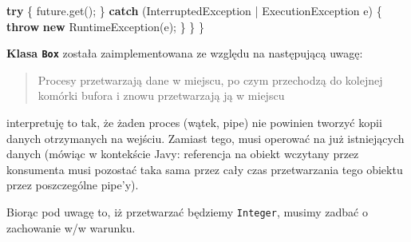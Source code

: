 \documentclass[11pt]{article}
\newenvironment{Shaded}{}{}
\newcommand{\KeywordTok}[1]{\textcolor[rgb]{0.00,0.44,0.13}{\textbf{{#1}}}}
\newcommand{\FunctionTok}[1]{\textcolor[rgb]{0.02,0.16,0.49}{{#1}}}
\newcommand{\NormalTok}[1]{{#1}}
\newcommand{\ControlFlowTok}[1]{\textcolor[rgb]{0.00,0.44,0.13}{\textbf{{#1}}}}
\newcommand{\OperatorTok}[1]{\textcolor[rgb]{0.40,0.40,0.40}{{#1}}}
\newcommand{\BuiltInTok}[1]{{#1}}
\begin{document}
\begin{Shaded}
\begin{Highlighting}[]
        \ControlFlowTok{try} \OperatorTok{\{}
\NormalTok{            future}\OperatorTok{.}\FunctionTok{get}\OperatorTok{();}
        \OperatorTok{\}} \ControlFlowTok{catch} \OperatorTok{(}\BuiltInTok{InterruptedException} \OperatorTok{|} \BuiltInTok{ExecutionException}\NormalTok{ e}\OperatorTok{)} \OperatorTok{\{}
            \ControlFlowTok{throw} \KeywordTok{new} \BuiltInTok{RuntimeException}\OperatorTok{(}\NormalTok{e}\OperatorTok{);}
        \OperatorTok{\}}
    \OperatorTok{\}}
\OperatorTok{\}}
\end{Highlighting}
\end{Shaded}

    \textbf{Klasa \texttt{Box}} została zaimplementowana ze względu na
następującą uwagę:

\begin{quote}
Procesy przetwarzają dane w miejscu, po czym przechodzą do kolejnej
komórki bufora i znowu przetwarzają ją w miejscu
\end{quote}

interpretuję to tak, że żaden proces (wątek, pipe) nie powinien tworzyć
kopii danych otrzymanych na wejściu. Zamiast tego, musi operować na już
istniejących danych (mówiąc w kontekście Javy: referencja na obiekt
wczytany przez konsumenta musi pozostać taka sama przez cały czas
przetwarzania tego obiektu przez poszczególne pipe'y).

Biorąc pod uwagę to, iż przetwarzać będziemy \texttt{Integer}, musimy
zadbać o zachowanie w/w warunku.
\end{document}
